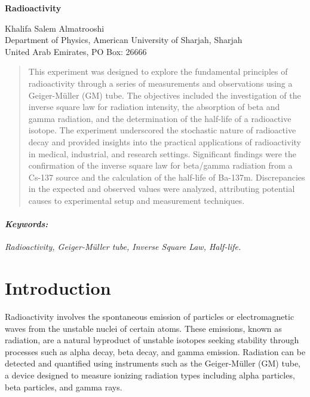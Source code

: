 \documentclass[11pt]{article}
\begin{document}
	
	\begin{titlepage}
		\begin{center}
			\begin{Large}
				\textbf{Radioactivity} \\
			\end{Large}
			\vspace{0.5cm}
			Khalifa Salem Almatrooshi \\
			\vspace{0.5cm}
			Department of Physics, American University of Sharjah, Sharjah \\
			United Arab Emirates, PO Box: 26666
		\end{center}
		\begin{abstract}
			\noindent
			This experiment was designed to explore the fundamental principles of radioactivity through a series of measurements and observations using a Geiger-Müller (GM) tube. The objectives included the investigation of the inverse square law for radiation intensity, the absorption of beta and gamma radiation, and the determination of the half-life of a radioactive isotope. The experiment underscored the stochastic nature of radioactive decay and provided insights into the practical applications of radioactivity in medical, industrial, and research settings. Significant findings were the confirmation of the inverse square law for beta/gamma radiation from a Cs-137 source and the calculation of the half-life of Ba-137m. Discrepancies in the expected and observed values were analyzed, attributing potential causes to experimental setup and measurement techniques. 
		\end{abstract}
		\paragraph{\textit{Keywords:}} \textit{Radioactivity, Geiger-Müller tube, Inverse Square Law, Half-life.}
	\end{titlepage}
	
\clearpage
	
	\section{Introduction}	

	Radioactivity involves the spontaneous emission of particles or electromagnetic waves from the unstable nuclei of certain atoms. These emissions, known as radiation, are a natural byproduct of unstable isotopes seeking stability through processes such as alpha decay, beta decay, and gamma emission. Radiation can be detected and quantified using instruments such as the Geiger-Müller (GM) tube, a device designed to measure ionizing radiation types including alpha particles, beta particles, and gamma rays.
	
\end{document}
